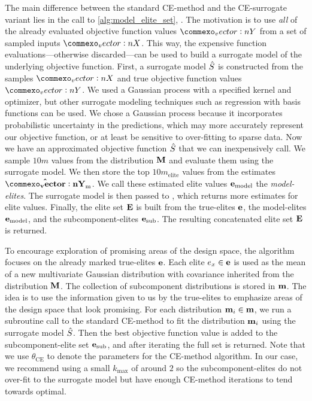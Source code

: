 \vspace{5mm} %



\newpage %

The main difference between the standard CE-method and the CE-surrogate variant lies in the call to \cref{alg:model_elite_set}, .
The motivation is to use \textit{all} of the already evaluated objective function values $\mat{Y}$ from a set of sampled inputs $\mat{X}$.
This way, the expensive function evaluations---otherwise discarded---can be used to build a surrogate model of the underlying objective function.
First, a surrogate model $\hat{S}$ is constructed from the samples $\mat{X}$ and true objective function values $\mat{Y}$.
We used a Gaussian process with a specified kernel and optimizer, but other surrogate modeling techniques such as regression with basis functions can be used.
We chose a Gaussian process because it incorporates probabilistic uncertainty in the predictions, which may more accurately represent our objective function, or at least be sensitive to over-fitting to sparse data.
Now we have an approximated objective function $\hat{S}$ that we can inexpensively call. 
We sample $10m$ values from the distribution $\mathbf{M}$ and evaluate them using the surrogate model.
We then store the top $10m_\text{elite}$ values from the estimates $\mathbf{\hat{\mat{Y}}}_\text{m}$.
We call these estimated elite values $\mathbf{e}_\text{model}$ the \textit{model-elites}.
The surrogate model is then passed to , which returns more estimates for elite values.
Finally, the elite set $\mathbf{E}$ is built from the true-elites $\mathbf{e}$, the model-elites $\mathbf{e}_\text{model}$, and the subcomponent-elites $\mathbf{e}_\text{sub}$.
The resulting concatenated elite set $\mathbf{E}$ is returned.



To encourage exploration of promising areas of the design space, the algorithm  focuses on the already marked true-elites $\mathbf{e}$.
Each elite $e_x \in \mathbf{e}$ is used as the mean of a new multivariate Gaussian distribution with covariance inherited from the distribution $\mathbf{M}$.
The collection of subcomponent distributions is stored in $\mathbf{m}$.
The idea is to use the information given to us by the true-elites to emphasize areas of the design space that look promising.
For each distribution $\mathbf{m}_i \in \mathbf{m}$, we run a subroutine call to the standard CE-method to fit the distribution $\mathbf{m}_i$ using the surrogate model $\hat{S}$. 
Then the best objective function value is added to the subcomponent-elite set $\mathbf{e}_\text{sub}$, and after iterating the full set is returned.
Note that we use $\theta_\text{CE}$ to denote the parameters for the CE-method algorithm.
In our case, we recommend using a small $k_\text{max}$ of around $2$ so the subcomponent-elites do not over-fit to the surrogate model but have enough CE-method iterations to tend towards optimal.

